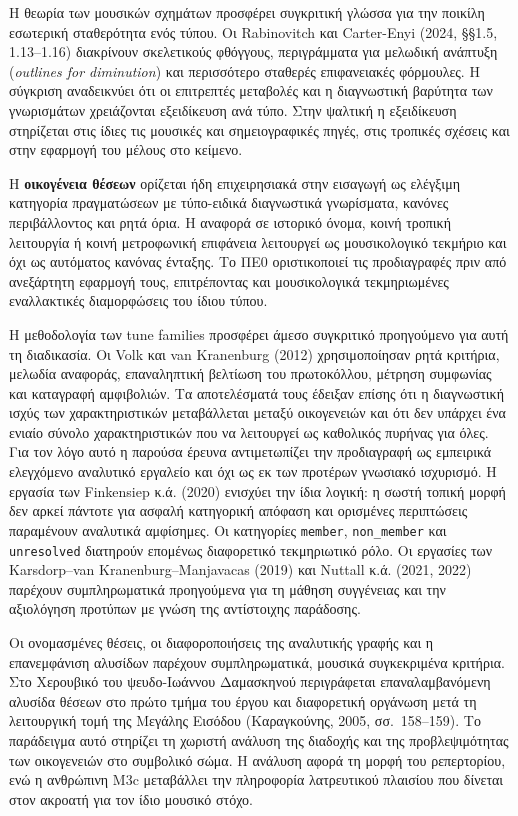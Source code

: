 \documentclass[11pt,a4paper]{article}
\begin{document}
Η θεωρία των μουσικών σχημάτων προσφέρει συγκριτική γλώσσα για την ποικίλη εσωτερική σταθερότητα ενός τύπου. Οι Rabinovitch και Carter-Enyi (2024, §§1.5, 1.13--1.16) διακρίνουν σκελετικούς φθόγγους, περιγράμματα για μελωδική ανάπτυξη (\emph{outlines for diminution}) και περισσότερο σταθερές επιφανειακές φόρμουλες. Η σύγκριση αναδεικνύει ότι οι επιτρεπτές μεταβολές και η διαγνωστική βαρύτητα των γνωρισμάτων χρειάζονται εξειδίκευση ανά τύπο. Στην ψαλτική η εξειδίκευση στηρίζεται στις ίδιες τις μουσικές και σημειογραφικές πηγές, στις τροπικές σχέσεις και στην εφαρμογή του μέλους στο κείμενο.

Η \textbf{οικογένεια θέσεων} ορίζεται ήδη επιχειρησιακά στην εισαγωγή ως ελέγξιμη κατηγορία πραγματώσεων με τύπο-ειδικά διαγνωστικά γνωρίσματα, κανόνες περιβάλλοντος και ρητά όρια. Η αναφορά σε ιστορικό όνομα, κοινή τροπική λειτουργία ή κοινή μετροφωνική επιφάνεια λειτουργεί ως μουσικολογικό τεκμήριο και όχι ως αυτόματος κανόνας ένταξης. Το ΠΕ0 οριστικοποιεί τις προδιαγραφές πριν από ανεξάρτητη εφαρμογή τους, επιτρέποντας και μουσικολογικά τεκμηριωμένες εναλλακτικές διαμορφώσεις του ίδιου τύπου.

Η μεθοδολογία των tune families προσφέρει άμεσο συγκριτικό προηγούμενο για αυτή τη διαδικασία. Οι Volk και van Kranenburg (2012) χρησιμοποίησαν ρητά κριτήρια, μελωδία αναφοράς, επαναληπτική βελτίωση του πρωτοκόλλου, μέτρηση συμφωνίας και καταγραφή αμφιβολιών. Τα αποτελέσματά τους έδειξαν επίσης ότι η διαγνωστική ισχύς των χαρακτηριστικών μεταβάλλεται μεταξύ οικογενειών και ότι δεν υπάρχει ένα ενιαίο σύνολο χαρακτηριστικών που να λειτουργεί ως καθολικός πυρήνας για όλες. Για τον λόγο αυτό η παρούσα έρευνα αντιμετωπίζει την προδιαγραφή ως εμπειρικά ελεγχόμενο αναλυτικό εργαλείο και όχι ως εκ των προτέρων γνωσιακό ισχυρισμό. Η εργασία των Finkensiep κ.ά. (2020) ενισχύει την ίδια λογική: η σωστή τοπική μορφή δεν αρκεί πάντοτε για ασφαλή κατηγορική απόφαση και ορισμένες περιπτώσεις παραμένουν αναλυτικά αμφίσημες. Οι κατηγορίες \texttt{member}, \texttt{non\_member} και \texttt{unresolved} διατηρούν επομένως διαφορετικό τεκμηριωτικό ρόλο. Οι εργασίες των Karsdorp--van Kranenburg--Manjavacas (2019) και Nuttall κ.ά. (2021, 2022) παρέχουν συμπληρωματικά προηγούμενα για τη μάθηση συγγένειας και την αξιολόγηση προτύπων με γνώση της αντίστοιχης παράδοσης.


Οι ονομασμένες θέσεις, οι διαφοροποιήσεις της αναλυτικής γραφής και η επανεμφάνιση αλυσίδων παρέχουν συμπληρωματικά, μουσικά συγκεκριμένα κριτήρια. Στο Χερουβικό του ψευδο-Ιωάννου Δαμασκηνού περιγράφεται επαναλαμβανόμενη αλυσίδα θέσεων στο πρώτο τμήμα του έργου και διαφορετική οργάνωση μετά τη λειτουργική τομή της Μεγάλης Εισόδου (Καραγκούνης, 2005, σσ.~158--159). Το παράδειγμα αυτό στηρίζει τη χωριστή ανάλυση της διαδοχής και της προβλεψιμότητας των οικογενειών στο συμβολικό σώμα. Η ανάλυση αφορά τη μορφή του ρεπερτορίου, ενώ η ανθρώπινη M3c μεταβάλλει την πληροφορία λατρευτικού πλαισίου που δίνεται στον ακροατή για τον ίδιο μουσικό στόχο.
\end{document}
